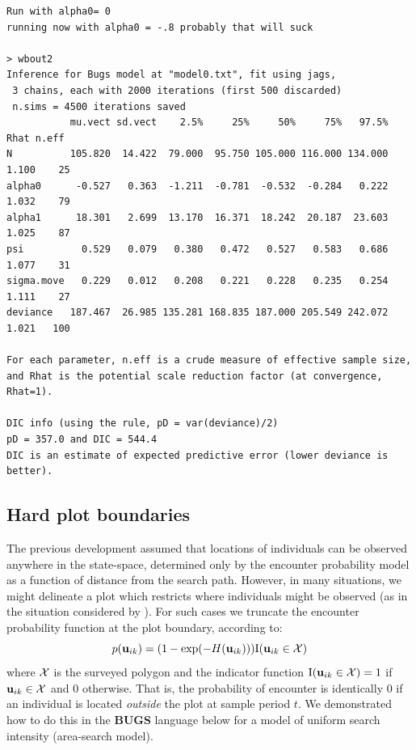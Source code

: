 \begin{verbatim}
Run with alpha0= 0
running now with alpha0 = -.8 probably that will suck

> wbout2
Inference for Bugs model at "model0.txt", fit using jags,
 3 chains, each with 2000 iterations (first 500 discarded)
 n.sims = 4500 iterations saved
           mu.vect sd.vect    2.5%     25%     50%     75%   97.5%  Rhat n.eff
N          105.820  14.422  79.000  95.750 105.000 116.000 134.000 1.100    25
alpha0      -0.527   0.363  -1.211  -0.781  -0.532  -0.284   0.222 1.032    79
alpha1      18.301   2.699  13.170  16.371  18.242  20.187  23.603 1.025    87
psi          0.529   0.079   0.380   0.472   0.527   0.583   0.686 1.077    31
sigma.move   0.229   0.012   0.208   0.221   0.228   0.235   0.254 1.111    27
deviance   187.467  26.985 135.281 168.835 187.000 205.549 242.072 1.021   100

For each parameter, n.eff is a crude measure of effective sample size,
and Rhat is the potential scale reduction factor (at convergence, Rhat=1).

DIC info (using the rule, pD = var(deviance)/2)
pD = 357.0 and DIC = 544.4
DIC is an estimate of expected predictive error (lower deviance is better).
\end{verbatim}




\subsection{Hard plot boundaries}

The previous development assumed that locations of individuals can be
observed anywhere in the state-space, determined only by the encounter
probability model as a function of distance from the search path.
However, in many situations, we might delineate a
plot which restricts where individuals might be observed (as in the
situation considered by \citet{royle_young:2008}).  For such cases we
truncate the encounter probability function at the plot boundary,
according to:
\begin{equation}
p({\bf u}_{ik}) = (1- \exp(-H({\bf u}_{ik}))) \mbox{I}({\bf u}_{ik} \in {\cal X})
\label{search-encounter.eq.hardplot}
\end{equation}
where ${\cal X}$ is the surveyed polygon and the indicator function
$\mbox{I}({\bf u}_{ik} \in {\cal X}) = 1$ if ${\bf u}_{ik} \in {\cal
  X}$ and 0 otherwise.  That is, the probability of encounter is
identically 0 if an individual is located {\it outside} the plot at
sample period $t$.  We demonstrated how to do this in the {\bf BUGS}
language below for a model of uniform search intensity (area-search model).



